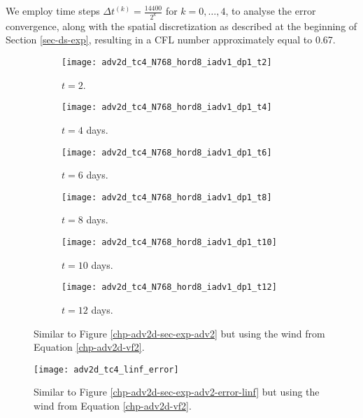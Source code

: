We employ time steps $\Delta t^{(k)}=\frac{14400}{2^{k}}$ for 
$k = 0, \ldots, 4$, to analyse the error convergence, 
along with the spatial discretization as described at the beginning of Section \ref{sec-ds-exp},
resulting in a CFL number approximately equal to 0.67.
\begin{figure}[!htb]
	\centering
	\begin{subfigure}{0.25\textwidth}
		\centering
		\texttt{[image: adv2d\_tc4\_N768\_hord8\_iadv1\_dp1\_t2]}
		\caption{$t=2$.\label{chp-adv2d-sec-exp-adv3-a}}
	\end{subfigure}
	\begin{subfigure}{0.25\textwidth}
		\centering
		\texttt{[image: adv2d\_tc4\_N768\_hord8\_iadv1\_dp1\_t4]}
		\caption{$t=4$ days.\label{chp-adv2d-sec-exp-adv3-b}}
	\end{subfigure}
	\begin{subfigure}{0.25\textwidth}
		\centering
		\texttt{[image: adv2d\_tc4\_N768\_hord8\_iadv1\_dp1\_t6]}
		\caption{$t=6$ days.\label{chp-adv2d-sec-exp-adv3-c}}
	\end{subfigure}
	
	\begin{subfigure}{0.25\textwidth}
		\centering
		\texttt{[image: adv2d\_tc4\_N768\_hord8\_iadv1\_dp1\_t8]}
		\caption{$t=8$ days.\label{chp-adv2d-sec-exp-adv3-d}}
	\end{subfigure}
	\begin{subfigure}{0.25\textwidth}
		\centering
		\texttt{[image: adv2d\_tc4\_N768\_hord8\_iadv1\_dp1\_t10]}
		\caption{$t=10$ days.\label{chp-adv2d-sec-exp-adv3-e}}
	\end{subfigure}
	\begin{subfigure}{0.25\textwidth}
		\centering
		\texttt{[image: adv2d\_tc4\_N768\_hord8\_iadv1\_dp1\_t12]}
		\caption{$t=12$ days.\label{chp-adv2d-sec-exp-adv3-f}}
	\end{subfigure}
\caption{Similar to Figure \ref{chp-adv2d-sec-exp-adv2}
but using the wind from Equation \eqref{chp-adv2d-vf2}.\label{chp-adv2d-sec-exp-adv3}}
\end{figure}


\begin{figure}[!htb]
\centering
\texttt{[image: adv2d\_tc4\_linf\_error]}
\caption{Similar to Figure \ref{chp-adv2d-sec-exp-adv2-error-linf}
but using the wind from Equation \eqref{chp-adv2d-vf2}.\label{chp-adv2d-sec-exp-adv3-error-linf}}
\end{figure}

